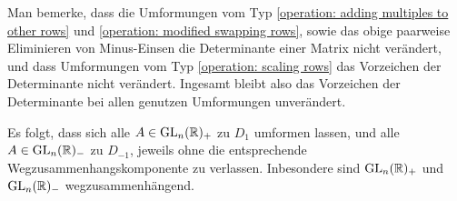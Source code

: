 Man bemerke, dass die Umformungen vom Typ \ref{operation: adding multiples to other rows} und \ref{operation: modified swapping rows}, sowie das obige paarweise Eliminieren von Minus-Einsen  die Determinante einer Matrix nicht verändert, und dass Umformungen vom Typ \ref{operation: scaling rows} das Vorzeichen der Determinante nicht verändert.
Ingesamt bleibt also das Vorzeichen der Determinante bei allen genutzen Umformungen unverändert.

Es folgt, dass sich alle $A \in \operatorname{GL}_{n}(\mathbb{R})_+$ zu $D_1$ umformen lassen, und alle $A \in \operatorname{GL}_{n}(\mathbb{R})_-$ zu $D_{-1}$, jeweils ohne die entsprechende Wegzusammenhangskomponente zu verlassen.
Inbesondere sind $\operatorname{GL}_{n}(\mathbb{R})_+$ und $\operatorname{GL}_{n}(\mathbb{R})_-$ wegzusammenhängend.














